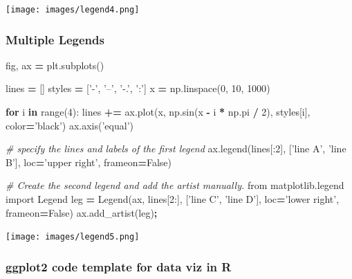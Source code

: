 \documentclass[]{book}
\newenvironment{Shaded}{\begin{snugshade}}{\end{snugshade}}
\newcommand{\BuiltInTok}[1]{#1}
\newcommand{\CommentTok}[1]{\textcolor[rgb]{0.56,0.35,0.01}{\textit{#1}}}
\newcommand{\ControlFlowTok}[1]{\textcolor[rgb]{0.13,0.29,0.53}{\textbf{#1}}}
\newcommand{\DecValTok}[1]{\textcolor[rgb]{0.00,0.00,0.81}{#1}}
\newcommand{\ImportTok}[1]{#1}
\newcommand{\KeywordTok}[1]{\textcolor[rgb]{0.13,0.29,0.53}{\textbf{#1}}}
\newcommand{\NormalTok}[1]{#1}
\newcommand{\OperatorTok}[1]{\textcolor[rgb]{0.81,0.36,0.00}{\textbf{#1}}}
\newcommand{\StringTok}[1]{\textcolor[rgb]{0.31,0.60,0.02}{#1}}
\newcommand{\VariableTok}[1]{\textcolor[rgb]{0.00,0.00,0.00}{#1}}
\begin{document}
\texttt{[image: images/legend4.png]}

\hypertarget{multiple-legends}{%
\subsubsection{Multiple Legends}\label{multiple-legends}}

\begin{Shaded}
\begin{Highlighting}[]
\NormalTok{fig, ax }\OperatorTok{=}\NormalTok{ plt.subplots()}

\NormalTok{lines }\OperatorTok{=}\NormalTok{ []}
\NormalTok{styles }\OperatorTok{=}\NormalTok{ [}\StringTok{'-'}\NormalTok{, }\StringTok{'--'}\NormalTok{, }\StringTok{'-.'}\NormalTok{, }\StringTok{':'}\NormalTok{]}
\NormalTok{x }\OperatorTok{=}\NormalTok{ np.linspace(}\DecValTok{0}\NormalTok{, }\DecValTok{10}\NormalTok{, }\DecValTok{1000}\NormalTok{)}

\ControlFlowTok{for}\NormalTok{ i }\KeywordTok{in} \BuiltInTok{range}\NormalTok{(}\DecValTok{4}\NormalTok{):}
\NormalTok{    lines }\OperatorTok{+=}\NormalTok{ ax.plot(x, np.sin(x }\OperatorTok{-}\NormalTok{ i }\OperatorTok{*}\NormalTok{ np.pi }\OperatorTok{/} \DecValTok{2}\NormalTok{),}
\NormalTok{                     styles[i], color}\OperatorTok{=}\StringTok{'black'}\NormalTok{)}
\NormalTok{ax.axis(}\StringTok{'equal'}\NormalTok{)}

\CommentTok{# specify the lines and labels of the first legend}
\NormalTok{ax.legend(lines[:}\DecValTok{2}\NormalTok{], [}\StringTok{'line A'}\NormalTok{, }\StringTok{'line B'}\NormalTok{],}
\NormalTok{          loc}\OperatorTok{=}\StringTok{'upper right'}\NormalTok{, frameon}\OperatorTok{=}\VariableTok{False}\NormalTok{)}

\CommentTok{# Create the second legend and add the artist manually.}
\ImportTok{from}\NormalTok{ matplotlib.legend }\ImportTok{import}\NormalTok{ Legend}
\NormalTok{leg }\OperatorTok{=}\NormalTok{ Legend(ax, lines[}\DecValTok{2}\NormalTok{:], [}\StringTok{'line C'}\NormalTok{, }\StringTok{'line D'}\NormalTok{],}
\NormalTok{             loc}\OperatorTok{=}\StringTok{'lower right'}\NormalTok{, frameon}\OperatorTok{=}\VariableTok{False}\NormalTok{)}
\NormalTok{ax.add_artist(leg)}\OperatorTok{;}
\end{Highlighting}
\end{Shaded}

\texttt{[image: images/legend5.png]}

\hypertarget{ggplot2-code-template-for-data-viz-in-r}{%
\subsubsection{ggplot2 code template for data viz in R}\label{ggplot2-code-template-for-data-viz-in-r}}
\end{document}

